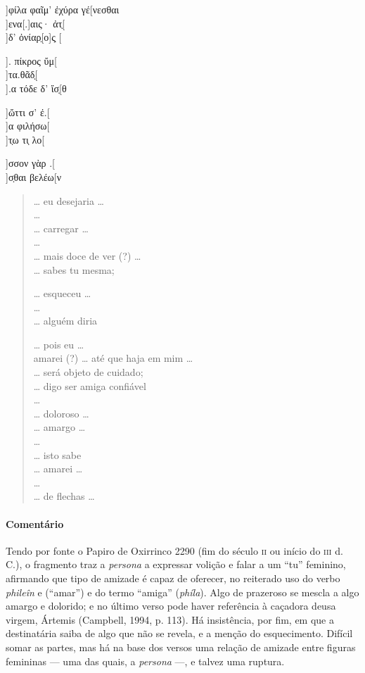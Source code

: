 {\begin{gkverse}
]φίλα φαῖμ’ ἐχύρα γέ[νεσθαι\\
   ]ενα[.]αις· ἀτ̣[\\
          ]δ’ ὀνίαρ̣[ο]ς̣ [

        ]. πίκρος ὔμ[\\
        ]τα.θᾶδ̣[\\
        ].α τόδε δ’ ἴσ̣[θ

       ]ὤττι σ’ ἐ.[\\
]α φιλήσω[\\
]τ̣ω τι̣ λο[

]σσον γὰρ .[\\
          ]σ̣θαι βελέω[ν
\end{gkverse}

\pagebreak
\begin{verse}
\ldots{} eu desejaria \ldots{}\\
\ldots{}\\
\ldots{} carregar \ldots{}\\
\ldots{}\\
\ldots{} mais doce de ver (?) \ldots{}\\
\ldots{} sabes tu mesma;

\ldots{} esqueceu \ldots{}\\ 
\ldots{}\\
\ldots{} alguém diria

\ldots{} pois eu \ldots{}\\
amarei (?) \ldots{} até que haja em mim \ldots{}\\
\ldots{} será objeto de cuidado;\\
\ldots{} digo ser amiga confiável \\
\ldots{}\\
\ldots{} doloroso \ldots{}\\
\ldots{} amargo \ldots{}\\
\ldots{}\\
\ldots{} isto sabe\\
\ldots{} amarei \ldots{}\\
\ldots{}\\
\ldots{} de flechas \ldots{}
\end{verse}

{\paragraph{Comentário} Tendo por fonte o Papiro de Oxirrinco 2290 (fim do século \textsc{ii} ou início do \textsc{iii} d. C.), o fragmento traz a \textit{persona} a expressar volição e falar a um ``tu'' feminino, afirmando que tipo de amizade é capaz de oferecer, no reiterado uso do verbo \textit{phileîn} e (``amar'') e do termo ``amiga'' (\textit{phíla}). Algo de prazeroso se mescla a algo amargo e dolorido; e no último verso pode haver 
referência à caçadora deusa virgem, Ártemis (Campbell, 1994, p. 113). Há insistência, por fim, em que a destinatária saiba de algo que não se revela, e a menção do esquecimento. Difícil somar as partes, mas há na base dos versos  uma relação de amizade entre figuras femininas --- uma das quais, a \textit{persona} ---, e talvez uma ruptura.}




}
